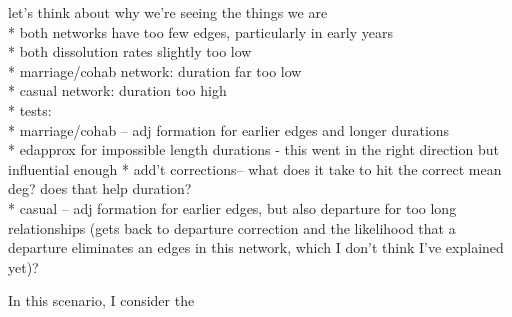 \documentclass [11pt, proquest] {uwthesis}[2015/03/03]
\begin{document}
let's think about why we're seeing the things we are\\
* both networks have too few edges, particularly in early years\\
* both dissolution rates slightly too low\\
* marriage/cohab network: duration far too low\\
* casual network: duration too high\\
* tests:\\
* marriage/cohab -- adj formation for earlier edges and longer
durations\\
* edapprox for impossible length durations - this went in the right
direction but influential enough * add't corrections-- what does it take
to hit the correct mean deg? does that help duration?\\
* casual -- adj formation for earlier edges, but also departure for too
long relationships (gets back to departure correction and the likelihood
that a departure eliminates an edges in this network, which I don't
think I've explained yet)?

In this scenario, I consider the
\end{document}
